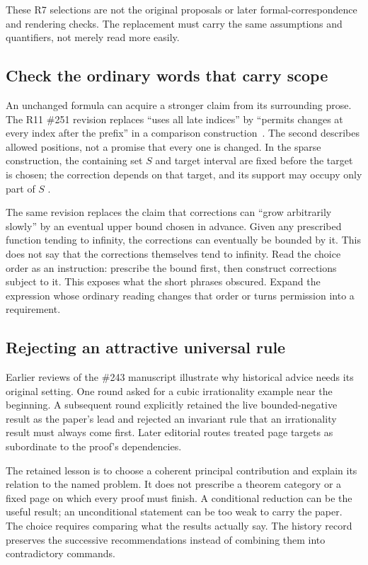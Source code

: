 These R7 selections are not the original proposals or later formal-correspondence
and rendering checks. The replacement must carry the same assumptions and
quantifiers, not merely read more easily.

\subsection{Check the ordinary words that carry scope}

An unchanged formula can acquire a stronger claim from its surrounding prose.
The R11 \#251 revision replaces ``uses all late indices'' by
``permits changes at every index after the prefix'' in a comparison
construction~\cite[comparison construction]{paper251long}. The second describes allowed positions, not a promise that
every one is changed. In the sparse construction, the containing set $S$ and
target interval are fixed before the target is chosen; the correction depends
on that target, and its support may occupy only part of $S$
\cite[sparse-perturbation proposition]{paper251}.

The same revision replaces the claim that corrections can ``grow arbitrarily
slowly'' by an eventual upper bound chosen in advance. Given any prescribed
function tending to infinity, the corrections can eventually be bounded by
it. This does not say that the corrections themselves tend to infinity.
Read the choice order as an instruction: prescribe the bound first, then
construct corrections subject to it. This exposes what the short phrases
obscured. Expand the expression whose ordinary reading changes that order
or turns permission into a requirement.

\subsection{Rejecting an attractive universal rule}

Earlier reviews of the \#243 manuscript illustrate why historical advice
needs its original setting. One round asked for a cubic irrationality example
near the beginning. A subsequent round explicitly retained the live
bounded-negative result as the paper's lead and rejected an invariant rule
that an irrationality result must always come first. Later editorial routes
treated page targets as subordinate to the proof's dependencies.

The retained lesson is to choose a coherent principal contribution and explain
its relation to the named problem. It does not prescribe a theorem category
or a fixed page on which every proof must finish. A conditional reduction
can be the useful result; an unconditional statement can be too weak to carry
the paper. The choice requires comparing what the results actually say. The
history record preserves the successive recommendations instead of combining
them into contradictory commands.


